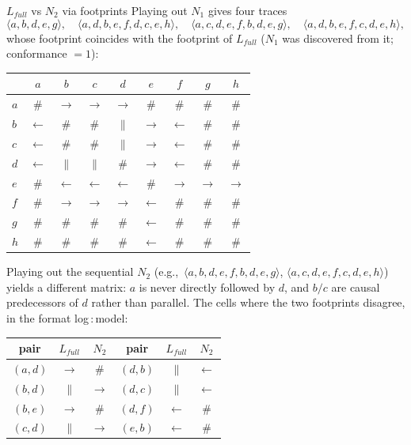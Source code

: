 \begin{examplebox}{$L_{full}$ vs $N_2$ via footprints}
Playing out $N_1$ gives four traces
\[\langle a,b,d,e,g \rangle, \quad \langle a,d,b,e,f,d,c,e,h \rangle, \quad \langle a,c,d,e,f,b,d,e,g \rangle, \quad \langle a,d,b,e,f,c,d,e,h \rangle,\]
whose footprint coincides with the footprint of $L_{full}$ ($N_1$ was discovered from it; conformance $= 1$):
\begin{center}
\small
\begin{tabular}{l*{8}{c}}
\toprule
 & $a$ & $b$ & $c$ & $d$ & $e$ & $f$ & $g$ & $h$ \\
\midrule
$a$ & $\#$ & $\to$ & $\to$ & $\to$ & $\#$ & $\#$ & $\#$ & $\#$ \\
$b$ & $\leftarrow$ & $\#$ & $\#$ & $\|$ & $\to$ & $\leftarrow$ & $\#$ & $\#$ \\
$c$ & $\leftarrow$ & $\#$ & $\#$ & $\|$ & $\to$ & $\leftarrow$ & $\#$ & $\#$ \\
$d$ & $\leftarrow$ & $\|$ & $\|$ & $\#$ & $\to$ & $\leftarrow$ & $\#$ & $\#$ \\
$e$ & $\#$ & $\leftarrow$ & $\leftarrow$ & $\leftarrow$ & $\#$ & $\to$ & $\to$ & $\to$ \\
$f$ & $\#$ & $\to$ & $\to$ & $\to$ & $\leftarrow$ & $\#$ & $\#$ & $\#$ \\
$g$ & $\#$ & $\#$ & $\#$ & $\#$ & $\leftarrow$ & $\#$ & $\#$ & $\#$ \\
$h$ & $\#$ & $\#$ & $\#$ & $\#$ & $\leftarrow$ & $\#$ & $\#$ & $\#$ \\
\bottomrule
\end{tabular}
\end{center}
Playing out the sequential $N_2$ (e.g.,\ $\langle a,b,d,e,f,b,d,e,g \rangle$, $\langle a,c,d,e,f,c,d,e,h \rangle$) yields a different matrix: $a$ is never directly followed by $d$, and $b/c$ are causal predecessors of $d$ rather than parallel. The cells where the two footprints disagree, in the format log\,:\,model:
\begin{center}
\small
\begin{tabular}{ccc@{\qquad}ccc}
\toprule
pair & $L_{full}$ & $N_2$ & pair & $L_{full}$ & $N_2$ \\
\midrule
$(a,d)$ & $\to$ & $\#$ & $(d,b)$ & $\|$ & $\leftarrow$ \\
$(b,d)$ & $\|$ & $\to$ & $(d,c)$ & $\|$ & $\leftarrow$ \\
$(b,e)$ & $\to$ & $\#$ & $(d,f)$ & $\leftarrow$ & $\#$ \\
$(c,d)$ & $\|$ & $\to$ & $(e,b)$ & $\leftarrow$ & $\#$ \\

\end{tabular}
\end{center}
\end{examplebox}
